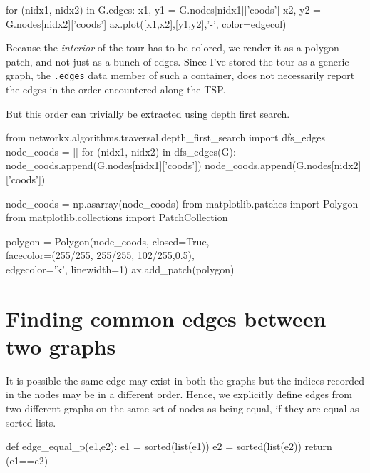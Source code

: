 for  (nidx1, nidx2) in G.edges:
    x1, y1 = G.nodes[nidx1]['coods']
    x2, y2 = G.nodes[nidx2]['coods']
    ax.plot([x1,x2],[y1,y2],'-', color=edgecol)
\nwendcode{}\nwdocspar

Because the \textit{interior} of the tour has to be colored, we render it as a polygon patch, and not
just as a bunch of edges. Since I've stored the tour as a generic graph, 
the \verb|.edges| data member of such a container, does not necessarily report 
the edges in the order encountered along the TSP. 

But this order can trivially be extracted using depth first search. 

\nwenddocs{}\endmoddef\nwstartdeflinemarkup{}\nwenddeflinemarkup
from networkx.algorithms.traversal.depth_first_search import dfs_edges
node_coods = []
for (nidx1, nidx2) in dfs_edges(G):
       node_coods.append(G.nodes[nidx1]['coods'])
       node_coods.append(G.nodes[nidx2]['coods'])

node_coods = np.asarray(node_coods)
from matplotlib.patches import Polygon
from matplotlib.collections import PatchCollection

polygon = Polygon(node_coods, closed=True, \\
                  facecolor=(255/255, 255/255, 102/255,0.5), \\
                  edgecolor='k', linewidth=1)
ax.add_patch(polygon)
\nwendcode{}\nwdocspar



\section{Finding common edges between two graphs}


It is possible the same edge may exist in both the graphs
but the indices recorded in the nodes may be in a different order. 
Hence, we explicitly define edges from two different graphs on the same set of nodes
as being equal, if they are equal as sorted lists.

\nwenddocs{}\endmoddef\nwstartdeflinemarkup{}\nwenddeflinemarkup
def edge_equal_p(e1,e2):
     e1 = sorted(list(e1))
     e2 = sorted(list(e2))
     return (e1==e2)
\nwendcode{}\nwdocspar

